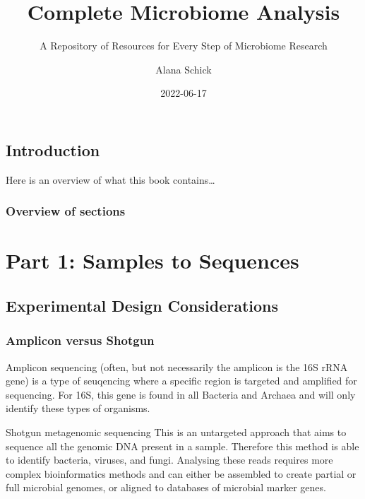\documentclass[
]{book}
\title{Complete Microbiome Analysis}
\subtitle{A Repository of Resources for Every Step of Microbiome Research}
\author{Alana Schick}
\date{2022-06-17}
\begin{document}
\maketitle

{
\setcounter{tocdepth}{1}
\tableofcontents
}
\hypertarget{introduction}{%
\chapter*{Introduction}\label{introduction}}

Here is an overview of what this book contains\ldots{}

\hypertarget{overview-of-sections}{%
\section*{Overview of sections}\label{overview-of-sections}}

\hypertarget{part-part-1-samples-to-sequences}{%
\part{Part 1: Samples to Sequences}\label{part-part-1-samples-to-sequences}}

\hypertarget{experimental-design-considerations}{%
\chapter{Experimental Design Considerations}\label{experimental-design-considerations}}

\hypertarget{amplicon-versus-shotgun}{%
\section{Amplicon versus Shotgun}\label{amplicon-versus-shotgun}}

Amplicon sequencing (often, but not necessarily the amplicon is the 16S rRNA gene) is a type of seuqencing where a specific region is targeted and amplified for sequencing. For 16S, this gene is found in all Bacteria and Archaea and will only identify these types of organisms.

Shotgun metagenomic sequencing
This is an untargeted approach that aims to sequence all the genomic DNA present in a sample. Therefore this method is able to identify bacteria, viruses, and fungi. Analysing these reads requires more complex bioinformatics methods and can either be assembled to create partial or full microbial genomes, or aligned to databases of microbial marker genes.
\end{document}
